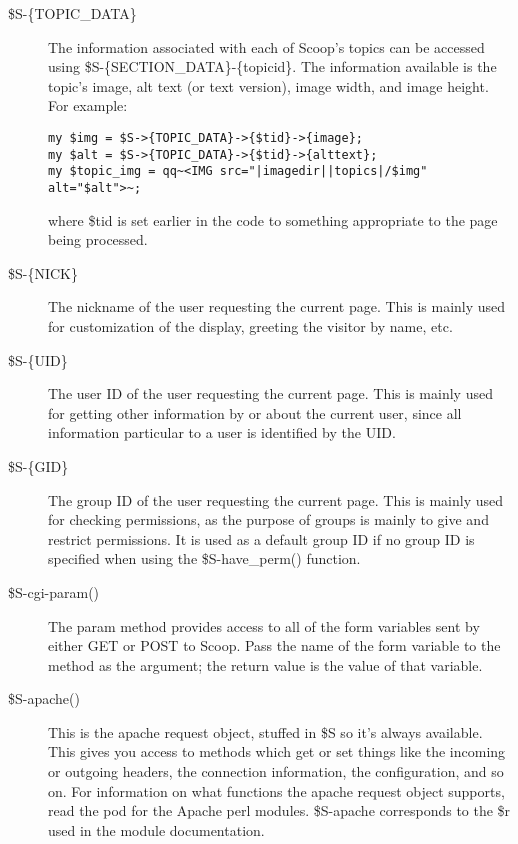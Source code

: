 \begin{description}
\item[\$S-\latexhtml{$>$}{>}\{TOPIC\_DATA\}] The information associated with each of Scoop's topics can be accessed using \$S-\latexhtml{$>$}{>}\{SECTION\_DATA\}-\latexhtml{$>$}{>}\{topicid\}. The information available is the topic's image, alt text (or text version), image width, and image height. For example:
\begin{verbatim}
my $img = $S->{TOPIC_DATA}->{$tid}->{image};
my $alt = $S->{TOPIC_DATA}->{$tid}->{alttext};
my $topic_img = qq~<IMG src="|imagedir||topics|/$img" alt="$alt">~;
\end{verbatim}
where \$tid is set earlier in the code to something appropriate to the page being processed.

\item[\$S-\latexhtml{$>$}{>}\{NICK\}] The nickname of the user requesting the current page. This is mainly used for customization of the display, greeting the visitor by name, etc.

\item[\$S-\latexhtml{$>$}{>}\{UID\}] The user ID of the user requesting the current page. This is mainly used for getting other information by or about the current user, since all information particular to a user is identified by the UID.

\item[\$S-\latexhtml{$>$}{>}\{GID\}] The group ID of the user requesting the current page. This is mainly used for checking permissions, as the purpose of groups is mainly to give and restrict permissions. It is used as a default group ID if no group ID is specified when using the \$S-\latexhtml{$>$}{>}have\_perm() function.

\end{description}

\begin{description}
\item[\$S-\latexhtml{$>$}{>}cgi-\latexhtml{$>$}{>}param()] The param method provides access to all of the form variables sent by either GET or POST to Scoop. Pass the name of the form variable to the method as the argument; the return value is the value of that variable.
\item[\$S-\latexhtml{$>$}{>}apache()] This is the apache request object, stuffed in \$S so it's always available. This gives you access to methods which get or set things like the incoming or outgoing headers, the connection information, the configuration, and so on. For information on what functions the apache request object supports, read the pod for the Apache perl modules. \$S-\latexhtml{$>$}{>}apache corresponds to the \$r used in the module documentation.
\end{description}

